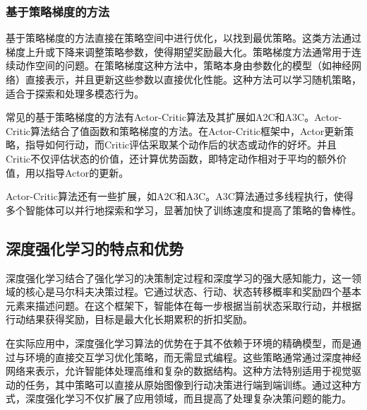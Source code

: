 \subsubsection{基于策略梯度的方法}

基于策略梯度的方法直接在策略空间中进行优化，以找到最优策略。这类方法通过梯度上升或下降来调整策略参数，使得期望奖励最大化。策略梯度方法通常用于连续动作空间的问题。在策略梯度这种方法中，策略本身由参数化的模型（如神经网络）直接表示，并且更新这些参数以直接优化性能。这种方法可以学习随机策略，适合于探索和处理多模态行为。

常见的基于策略梯度的方法有Actor-Critic算法及其扩展如A2C和A3C。Actor-Critic算法结合了值函数和策略梯度的方法。在Actor-Critic框架中，Actor更新策略，指导如何行动，而Critic评估采取某个动作后的状态或动作的好坏。并且Critic不仅评估状态的价值，还计算优势函数，即特定动作相对于平均的额外价值，用以指导Actor的更新。

Actor-Critic算法还有一些扩展，如A2C和A3C。A3C算法通过多线程执行，使得多个智能体可以并行地探索和学习，显著加快了训练速度和提高了策略的鲁棒性。

\subsection{深度强化学习的特点和优势}

深度强化学习结合了强化学习的决策制定过程和深度学习的强大感知能力，这一领域的核心是马尔科夫决策过程。它通过状态、行动、状态转移概率和奖励四个基本元素来描述问题。在这个框架下，智能体在每一步根据当前状态采取行动，并根据行动结果获得奖励，目标是最大化长期累积的折扣奖励。

在实际应用中，深度强化学习算法的优势在于其不依赖于环境的精确模型，而是通过与环境的直接交互学习优化策略，而无需显式编程。这些策略通常通过深度神经网络来表示，允许智能体处理高维和复杂的数据结构。这种方法特别适用于视觉驱动的任务，其中策略可以直接从原始图像到行动决策进行端到端训练。通过这种方式，深度强化学习不仅扩展了应用领域，而且提高了处理复杂决策问题的能力。
